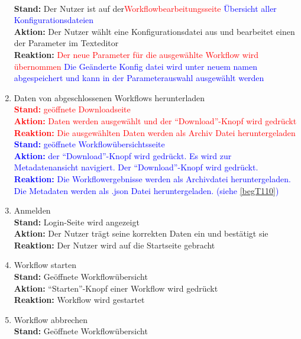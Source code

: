 \begin{enumerate}
        \\ \textbf{Stand:} Der \gls{Nutzer} ist auf der\textcolor{red}{Workflowbearbeitungsseite} \textcolor{blue}{Übersicht aller Konfigurationsdateien} 
        \\ \textbf{Aktion:} Der \gls{Nutzer} wählt eine Konfigurationsdatei aus und bearbeitet einen der Parameter im Texteditor
        \\ \textbf{Reaktion:} \textcolor{red}{Der neue Parameter für die ausgewählte \gls{Workflow} wird übernommen} \textcolor{blue}{Die Geänderte Konfig datei wird unter neuem namen abgespeichert und kann in der Parameterauswahl ausgewählt werden}
    \item Daten von abgeschlossenen \glspl{Workflow} herunterladen
        \textcolor{red}{
        \\ \textbf{Stand:} geöffnete Downloadseite
        \\ \textbf{Aktion:} Daten werden ausgewählt und der \enquote{Download}-Knopf wird gedrückt
        \\ \textbf{Reaktion:} Die ausgewählten Daten werden als Archiv Datei heruntergeladen}
        \textcolor{blue}{
        \\ \textbf{Stand:} geöffnete Workflowübersichtsseite
        \\ \textbf{Aktion:} der \enquote{Download}-Knopf wird gedrückt. Es wird zur Metadatenansicht navigiert. Der \enquote{Download}-Knopf wird gedrückt.
        \\ \textbf{Reaktion:} Die Workflowergebnisse werden als Archivdatei heruntergeladen. Die Metadaten werden als .json Datei heruntergeladen. (siehe \ref{begT110})
        }
    \item Anmelden
        \\ \textbf{Stand:} Login-Seite wird angezeigt
        \\ \textbf{Aktion:} Der \gls{Nutzer} trägt seine korrekten Daten ein und bestätigt sie
        \\ \textbf{Reaktion:} Der \gls{Nutzer} wird auf die Startseite gebracht
    \item \gls{Workflow} starten
        \\ \textbf{Stand:} Geöffnete Workflowübersicht 
        \\ \textbf{Aktion:} \enquote{Starten}-Knopf einer \gls{Workflow} wird gedrückt
        \\ \textbf{Reaktion:} \gls{Workflow} wird gestartet
    \item \gls{Workflow} abbrechen
        \\ \textbf{Stand:} Geöffnete Workflowübersicht

\end{enumerate}

